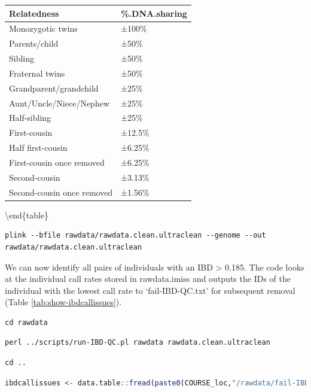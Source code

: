 \documentclass[
]{book}
\begin{document}
\begin{tabular}[t]{l|l}
\hline
Relatedness & \%.DNA.sharing\\
\hline
Monozygotic twins & ±100\%\\
\hline
Parents/child & ±50\%\\
\hline
Sibling & ±50\%\\
\hline
Fraternal twins & ±50\%\\
\hline
Grandparent/grandchild & ±25\%\\
\hline
Aunt/Uncle/Niece/Nephew & ±25\%\\
\hline
Half-sibling & ±25\%\\
\hline
First-cousin & ±12.5\%\\
\hline
Half first-cousin & ±6.25\%\\
\hline
First-cousin once removed & ±6.25\%\\
\hline
Second-cousin & ±3.13\%\\
\hline
Second-cousin once removed & ±1.56\%\\
\hline
\end{tabular}

\textbackslash end\{table\}

\begin{lstlisting}
plink --bfile rawdata/rawdata.clean.ultraclean --genome --out rawdata/rawdata.clean.ultraclean
\end{lstlisting}

We can now identify all pairs of individuals with an IBD \textgreater{} 0.185. The code looks at the individual call rates stored in rawdata.imiss and outputs the IDs of the individual with the lowest call rate to `fail-IBD-QC.txt' for subsequent removal (Table \ref{tab:show-ibdcallissues}).

\begin{lstlisting}
cd rawdata
\end{lstlisting}

\begin{lstlisting}
perl ../scripts/run-IBD-QC.pl rawdata rawdata.clean.ultraclean
\end{lstlisting}

\begin{lstlisting}
cd ..
\end{lstlisting}

\begin{lstlisting}[language=R]
ibdcallissues <- data.table::fread(paste0(COURSE_loc,"/rawdata/fail-IBD-QC.txt"))
\end{lstlisting}
\end{document}
